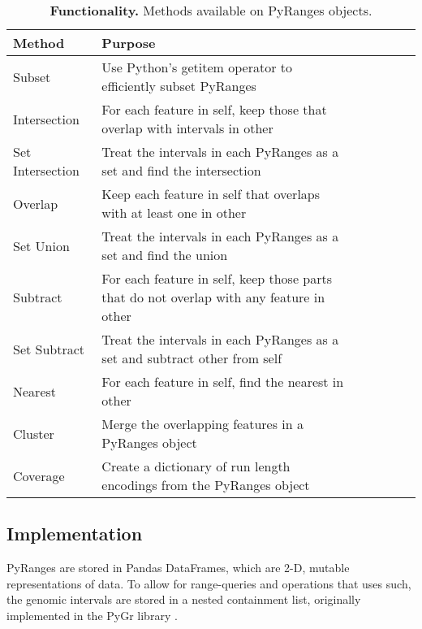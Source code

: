 \documentclass[10pt,letterpaper]{article}
\begin{document}
\begin{table}[!ht]
\begin{adjustwidth}{-1.5in}{0in}
\centering
\caption{{\bf Functionality.} Methods available on PyRanges objects.}
\begin{tabular}{|l|l|l|l|l|l|l|}
\hline
  {\bf Method} & {\bf Purpose} \\ \hline
  Subset & Use Python's getitem operator to efficiently subset PyRanges \\ \hline
  Intersection & For each feature in self, keep those that overlap with intervals in other \footnotemark \\ \hline
  Set Intersection & Treat the intervals in each PyRanges as a set and find the intersection \footnotemark \\ \hline
  Overlap & Keep each feature in self that overlaps with at least one in other \\ \hline
  Set Union & Treat the intervals in each PyRanges as a set and find the union \\ \hline
  Subtract & For each feature in self, keep those parts that do not overlap with any feature in other \\ \hline
  Set Subtract & Treat the intervals in each PyRanges as a set and subtract other from self \\ \hline
  Nearest & For each feature in self, find the nearest in other \\ \hline
  Cluster & Merge the overlapping features in a PyRanges object \\ \hline
  Coverage & Create a dictionary of run length encodings from the PyRanges object \\ \hline
\end{tabular}
\label{tab1}
\end{adjustwidth}
\end{table}


\subsection*{Implementation}

PyRanges are stored in Pandas DataFrames, which are 2-D, mutable representations
of data. To allow for range-queries and operations that uses such, the genomic
intervals are stored in a nested containment list, originally implemented in the
PyGr library \cite{doi:10.1093/bioinformatics/btl647}.
\end{document}
